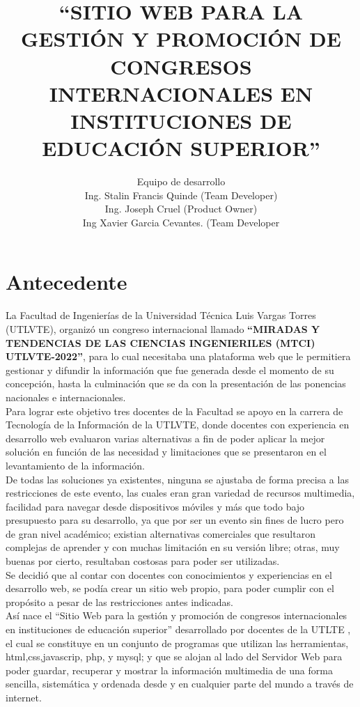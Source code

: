 \documentclass[a4paper,14px]{article}
\title{``SITIO WEB PARA LA GESTIÓN Y PROMOCIÓN DE CONGRESOS INTERNACIONALES EN INSTITUCIONES DE EDUCACIÓN SUPERIOR''}
\author{Equipo de desarrollo \\ Ing. Stalin Francis Quinde (Team Developer) \\ Ing. Joseph Cruel (Product Owner) \\ Ing Xavier Garcia Cevantes. (Team Developer }
\begin{document}
\maketitle

\section{Antecedente}
\label{sec:antecedente}
La Facultad de Ingenierías de la Universidad Técnica Luis Vargas Torres (UTLVTE), organizó un congreso internacional llamado \textbf{``MIRADAS Y TENDENCIAS  DE LAS CIENCIAS INGENIERILES (MTCI) UTLVTE-2022''}, para lo cual necesitaba una plataforma web que le permitiera gestionar y difundir la información que  fue generada desde el momento de su concepción, hasta la culminación que se da con la presentación de las ponencias nacionales e internacionales.\\

Para lograr este objetivo tres docentes de la Facultad se apoyo en la carrera de Tecnología de la Información de la UTLVTE, donde docentes con experiencia en desarrollo web evaluaron varias alternativas a fin de poder aplicar la mejor solución en función de las necesidad y limitaciones que se presentaron en el levantamiento de la información.\\

De todas las soluciones ya existentes, ninguna se ajustaba de forma precisa a las restricciones de este evento, las cuales eran  gran variedad de recursos multimedia, facilidad para navegar desde dispositivos móviles y  más que todo bajo presupuesto para su desarrollo, ya que por ser un evento sin fines de lucro pero de gran nivel académico; existian alternativas comerciales que resultaron complejas de aprender y con muchas limitación en su versión libre; otras, muy buenas por cierto, resultaban costosas para poder ser utilizadas.\\

Se decidió que al contar con docentes con conocimientos y experiencias en el desarrollo web,  se podía crear un  sitio web propio, para poder  cumplir con el propósito a pesar de las restricciones antes indicadas.\\

Así nace el  ``Sitio Web para la gestión y promoción de congresos internacionales en instituciones de educación superior'' desarrollado por docentes de la UTLTE , el cual se constituye en un  conjunto de programas que utilizan las  herramientas,  html,css,javascrip, php, y mysql; y que se alojan al lado del Servidor Web para poder guardar, recuperar y mostrar la información multimedia de una forma sencilla, sistemática y ordenada desde y en cualquier parte del mundo a través de internet.\\
\end{document}
